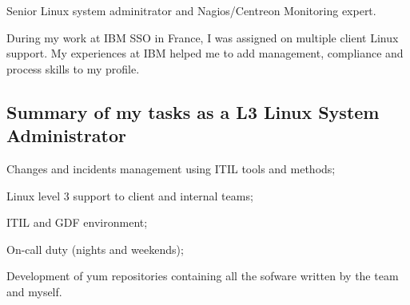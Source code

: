 
%
%
%
%



Senior Linux system adminitrator and Nagios/Centreon Monitoring expert.

During my work at IBM SSO in France, I was assigned on multiple client Linux support.
My experiences at IBM helped me to add management, compliance and process skills 
to my profile. 

\subsection{Summary of my tasks as a L3 Linux System Administrator}

\item{\bdot} Changes and incidents management using ITIL tools and methods;
\item{\bdot} Linux level 3 support to client and internal teams;
\item{\bdot} ITIL and GDF environment;
\item{\bdot} On-call duty (nights and weekends);
\item{\bdot} Development of yum repositories containing all the sofware 
   written by the team and myself.

